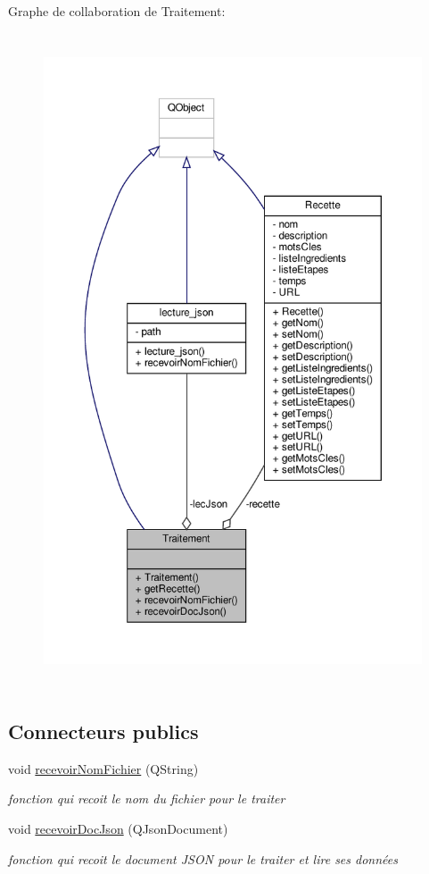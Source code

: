 Graphe de collaboration de Traitement\+:\nopagebreak
\begin{figure}[H]
\begin{center}
\leavevmode
\includegraphics[height=550pt]{classTraitement__coll__graph}
\end{center}
\end{figure}
\subsection*{Connecteurs publics}
\begin{DoxyCompactItemize}
\item 
void \hyperlink{classTraitement_aba97e5df1728c8062c3cb1b9fa104157}{recevoir\+Nom\+Fichier} (Q\+String)
\begin{DoxyCompactList}\small\item\em fonction qui recoit le nom du fichier pour le traiter \end{DoxyCompactList}\item 
void \hyperlink{classTraitement_aa66e6be8e21062472a6c1e9a95097dc5}{recevoir\+Doc\+Json} (Q\+Json\+Document)
\begin{DoxyCompactList}\small\item\em fonction qui recoit le document J\+S\+ON pour le traiter et lire ses données \end{DoxyCompactList}\end{DoxyCompactItemize}
